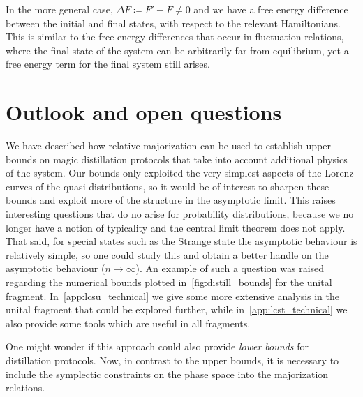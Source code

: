 \documentclass[pra,
aps,
twocolumn,
superscriptaddress,
groupedaddress,
nofootinbib,
reprint
]{revtex4-1}
\begin{document}
In the more general case, $\Delta F \coloneqq F' - F \ne 0$ and we have a free energy difference between the initial and final states, with respect to the relevant Hamiltonians. This is similar to the free energy differences that occur in fluctuation relations, where the final state of the system can be arbitrarily far from equilibrium, yet a free energy term for the final system still arises.


\section{Outlook and open questions}
\label{sec:lower_bounds}

We have described how relative majorization can be used to establish upper bounds on magic distillation protocols that take into account additional physics of the system. Our bounds only exploited the very simplest aspects of the Lorenz curves of the quasi-distributions, so it would be of interest to sharpen these bounds and exploit more of the structure in the asymptotic limit. This raises interesting questions that do no arise for probability distributions, because we no longer have a notion of typicality and the central limit theorem does not apply. That said, for special states such as the Strange state the asymptotic behaviour is relatively simple, so one could study this and obtain a better handle on the asymptotic behaviour ($n \rightarrow \infty$). An example of such a question was raised regarding the numerical bounds plotted in~\cref{fig:distill_bounds} for the unital fragment. In~\cref{app:lcsu_technical} we give some more extensive analysis in the unital fragment that could be explored further, while in~\cref{app:lcst_technical} we also provide some tools which are useful in all fragments.

One might wonder if this approach could also provide \emph{lower bounds} for distillation protocols. Now, in contrast to the upper bounds, it is necessary to include the symplectic constraints on the phase space into the majorization relations.
\end{document}
